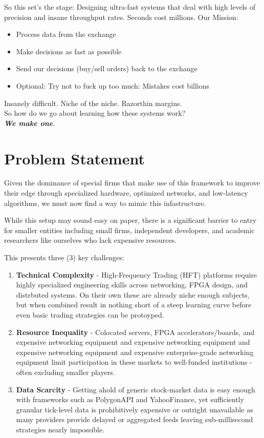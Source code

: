 \documentclass[12pt]{article}
\begin{document}
So this set's the stage: Designing ultra-fast systems that deal with high levels of precision and insane throughput rates.
Seconds cost millions. 
\newline
Our Mission: 
\begin{itemize}
  \item Process data from the exchange
  \item Make decisions as fast as possible
  \item Send our decisions (buy/sell orders) back to the exchange
  \item Optional: Try not to fuck up too much: Mistakes cost billions 
\end{itemize}

Insanely difficult.
Niche of the niche.
Razorthin margins.
\\ So how do we go about learning how these systems work? 
\newline
\\ \textbf{\emph{We make one}}.

\clearpage


\section*{Problem Statement}

Given the dominance of special firms that make use of this framework to improve their edge through specialized hardware, optimized networks, and low-latency algorithms, we must now find a way to mimic this infastructure. 

While this setup may sound easy on paper, there is a significant barrier to entry for smaller entities including small firms, independent developers, and academic researchers like ourselves who lack expensive resources.

This presents three (3) key challenges: 
\begin{enumerate}
  \item \textbf{Technical Complexity} - High-Frequency Trading (HFT) platforms require highly specialized engineering skills across networking, FPGA design, and distrbuted systems. On their own these are already niche enough subjects, but when combined result in nothing short of a steep learning curve before even basic trading strategies can be protoyped.
  \item \textbf{Resource Inequality} - Colocated servers, FPGA accelerators/boards, and expensive networking equipment  and expensive networking equipment  and expensive networking equipment  and expensive enterprise-grade networking equipment limit participation in these markets to well-funded institutions - often excluding smaller players.
  \item \textbf{Data Scarcity} - Getting ahold of generic stock-market data is easy enough with frameworks such as PolygonAPI and YahooFinance, yet sufficiently granular tick-level data is prohibitively expensive or outright unavailable as many providers provide delayed or aggregated feeds leaving sub-millisecond strategies nearly impossible. 
\end{enumerate}
\end{document}

